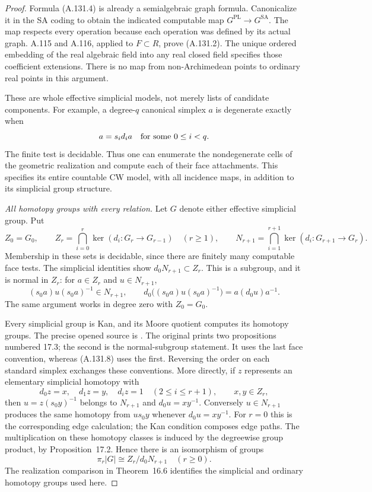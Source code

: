 \begin{proof}
Formula (A.131.4) is already a semialgebraic graph formula. Canonicalize
it in the SA coding to obtain the indicated computable map
$G^{\mathrm{PL}}\to G^{\mathrm{SA}}$. The map respects every
operation because each operation was defined by its actual graph.
A.115 and A.116, applied to $F\subset R$, prove (A.131.2).
The unique ordered embedding of the real algebraic field into any
real closed field specifies those coefficient extensions. There is
no map from non-Archimedean points to ordinary real points in this
argument.

These are whole effective simplicial models, not merely lists of
candidate components. For example, a degree-$q$ canonical simplex
$a$ is degenerate exactly when
\[
 a=s_i d_i a\quad\hbox{for some }0\le i<q.
\]
The finite test is decidable. Thus one can enumerate the
nondegenerate cells of the geometric realization and compute each
of their face attachments. This specifies its entire countable CW
model, with all incidence maps, in addition to its simplicial group
structure.

\emph{All homotopy groups with every relation.}
Let $G$ denote either effective simplicial group. Put
\[
 Z_0=G_0,\qquad
 Z_r=\bigcap_{i=0}^{r}\ker(d_i:G_r\to G_{r-1})\quad(r\ge1),
 \qquad
 N_{r+1}=\bigcap_{i=1}^{r+1}\ker(d_i:G_{r+1}\to G_r).
                                                        \tag{A.131.8}
\]
Membership in these sets is decidable, since there are finitely many
computable face tests. The simplicial identities show
$d_0N_{r+1}\subset Z_r$. This is a subgroup, and it is normal in
$Z_r$: for $a\in Z_r$ and $u\in N_{r+1}$,
\[
 (s_0a)u(s_0a)^{-1}\in N_{r+1},\qquad
 d_0\big((s_0a)u(s_0a)^{-1}\big)=a(d_0u)a^{-1}.
                                                        \tag{A.131.9}
\]
The same argument works in degree zero with $Z_0=G_0$.

Every simplicial group is Kan, and its Moore quotient computes its
homotopy groups. The precise opened source is
\cite[Theorem~17.1, pp.~67--68; Proposition~17.2, p.~68;
the second Proposition~17.3, pp.~68--69; Proposition~17.4, p.~69;
Theorem~16.6, p.~65]{May1967Simplicial}.
The original prints two propositions numbered 17.3; the second is
the normal-subgroup statement. It uses the last face convention,
whereas (A.131.8) uses the first. Reversing the order on each
standard simplex exchanges these conventions. More directly, if
$z$ represents an elementary simplicial homotopy with
\[
 d_0z=x,\quad d_1z=y,\quad d_i z=1\quad(2\le i\le r+1),
 \qquad x,y\in Z_r,
\]
then $u=z(s_0y)^{-1}$ belongs to $N_{r+1}$ and
$d_0u=xy^{-1}$. Conversely $u\in N_{r+1}$ produces the same
homotopy from $u s_0y$ whenever $d_0u=xy^{-1}$.
For $r=0$ this is the corresponding edge calculation; the Kan
condition composes edge paths. The multiplication on these
homotopy classes is induced by the degreewise group product,
by Proposition~17.2. Hence there is an isomorphism of groups
\[
 \pi_r|G|\cong Z_r/d_0N_{r+1}\quad(r\ge0).
                                                        \tag{A.131.10}
\]
The realization comparison in Theorem~16.6 identifies the simplicial
and ordinary homotopy groups used here.


\end{proof}
